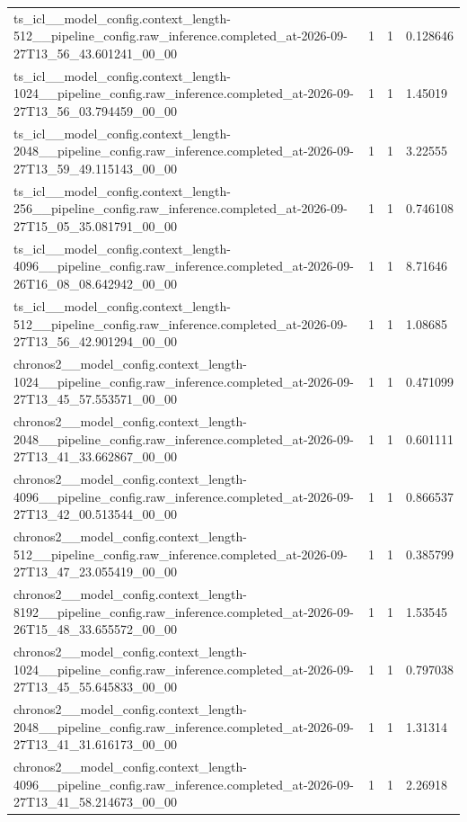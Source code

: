 \begin{tabular}{llll}
ts\_icl\_\_model\_config.context\_length-512\_\_pipeline\_config.raw\_inference.completed\_at-2026-09-27T13\_56\_43.601241\_00\_00 & 1 & 1 & 0.128646 \\
ts\_icl\_\_model\_config.context\_length-1024\_\_pipeline\_config.raw\_inference.completed\_at-2026-09-27T13\_56\_03.794459\_00\_00 & 1 & 1 & 1.45019 \\
ts\_icl\_\_model\_config.context\_length-2048\_\_pipeline\_config.raw\_inference.completed\_at-2026-09-27T13\_59\_49.115143\_00\_00 & 1 & 1 & 3.22555 \\
ts\_icl\_\_model\_config.context\_length-256\_\_pipeline\_config.raw\_inference.completed\_at-2026-09-27T15\_05\_35.081791\_00\_00 & 1 & 1 & 0.746108 \\
ts\_icl\_\_model\_config.context\_length-4096\_\_pipeline\_config.raw\_inference.completed\_at-2026-09-26T16\_08\_08.642942\_00\_00 & 1 & 1 & 8.71646 \\
ts\_icl\_\_model\_config.context\_length-512\_\_pipeline\_config.raw\_inference.completed\_at-2026-09-27T13\_56\_42.901294\_00\_00 & 1 & 1 & 1.08685 \\
chronos2\_\_model\_config.context\_length-1024\_\_pipeline\_config.raw\_inference.completed\_at-2026-09-27T13\_45\_57.553571\_00\_00 & 1 & 1 & 0.471099 \\
chronos2\_\_model\_config.context\_length-2048\_\_pipeline\_config.raw\_inference.completed\_at-2026-09-27T13\_41\_33.662867\_00\_00 & 1 & 1 & 0.601111 \\
chronos2\_\_model\_config.context\_length-4096\_\_pipeline\_config.raw\_inference.completed\_at-2026-09-27T13\_42\_00.513544\_00\_00 & 1 & 1 & 0.866537 \\
chronos2\_\_model\_config.context\_length-512\_\_pipeline\_config.raw\_inference.completed\_at-2026-09-27T13\_47\_23.055419\_00\_00 & 1 & 1 & 0.385799 \\
chronos2\_\_model\_config.context\_length-8192\_\_pipeline\_config.raw\_inference.completed\_at-2026-09-26T15\_48\_33.655572\_00\_00 & 1 & 1 & 1.53545 \\
chronos2\_\_model\_config.context\_length-1024\_\_pipeline\_config.raw\_inference.completed\_at-2026-09-27T13\_45\_55.645833\_00\_00 & 1 & 1 & 0.797038 \\
chronos2\_\_model\_config.context\_length-2048\_\_pipeline\_config.raw\_inference.completed\_at-2026-09-27T13\_41\_31.616173\_00\_00 & 1 & 1 & 1.31314 \\
chronos2\_\_model\_config.context\_length-4096\_\_pipeline\_config.raw\_inference.completed\_at-2026-09-27T13\_41\_58.214673\_00\_00 & 1 & 1 & 2.26918 \\

\end{tabular}
